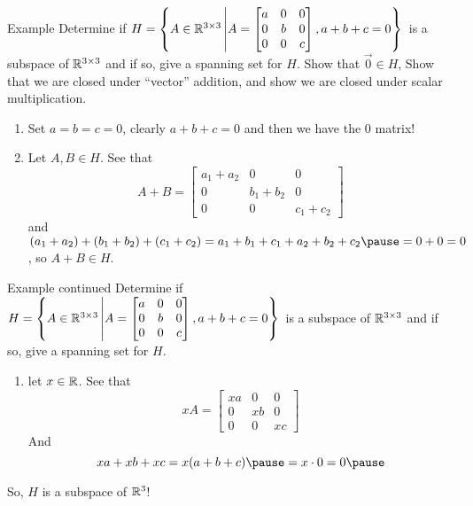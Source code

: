 \documentclass[xcoler=dvipsnames, aspectratio=169]{beamer}
\begin{document}
    \begin{frame}{Example}
        Determine if $H=\left\{A\in\mathbb{R}^{3\times 3}\left|A = \begin{bmatrix}
            a & 0 & 0\\
            0 & b & 0\\
            0 & 0 & c
        \end{bmatrix}, a + b + c = 0\right\}\right.$ is a subspace of $\mathbb{R}^{3\times 3}$ and if so, give a spanning set
        for $H$.\pause
        Show that $\vec{0}\in H$, Show that we are closed under ``vector'' addition, and show we 
        are closed under scalar multiplication.
        \begin{enumerate}
            \pause\item Set $a=b=c=0$, clearly $a+b+c=0$ and then we have the $0$ matrix!
            \pause\item Let $A,B\in H$. See that
                \[
                    A + B = \begin{bmatrix}
                        a_1 + a_2 & 0 & 0\\
                        0 & b_1 + b_2 & 0\\
                        0 & 0 & c_1 + c_2
                    \end{bmatrix}
                \]\pause
                and $(a_1+a_2) + (b_1+b_2) + (c_1+c_2) = a_1 + b_1 + c_1 + a_2 + b_2 + c_2 \pause = 0 + 0 = 0$, so $A+B\in H$.
        \end{enumerate}
    \end{frame}
    \begin{frame}{Example continued}
        Determine if $H=\left\{A\in\mathbb{R}^{3\times 3}\left|A = \begin{bmatrix}
            a & 0 & 0\\
            0 & b & 0\\
            0 & 0 & c
        \end{bmatrix}, a + b + c = 0\right\}\right.$ is a subspace of $\mathbb{R}^{3\times 3}$ and if so, give a spanning set
        for $H$.
        \begin{enumerate}\addtocounter{enumi}{2}
            \pause\item let $x\in\mathbb{R}$. See that
                \[
                    xA= \begin{bmatrix}
                        xa & 0 & 0\\
                        0 & xb & 0\\
                        0 & 0 & xc
                    \end{bmatrix}
                \]\pause
                And 
                \[
                    xa + xb + xc = x(a+b+c)\pause = x\cdot 0 = 0\pause
                \]
        \end{enumerate}
        So, $H$ is a subspace of $\mathbb{R}^3$!
    \end{frame}
\end{document}
